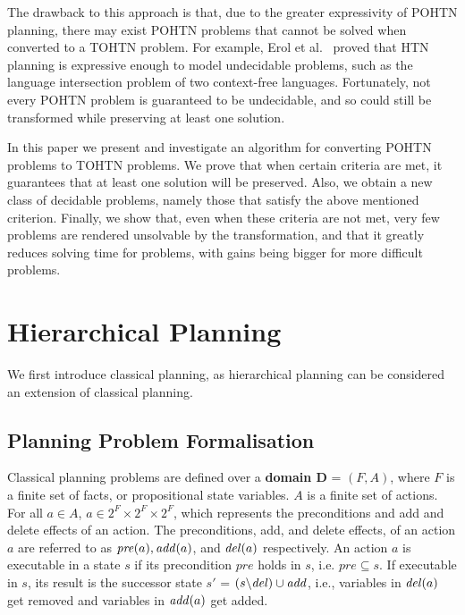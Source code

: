 \documentclass[runningheads]{llncs}
\begin{document}
The drawback to this approach is that, due to the greater expressivity of POHTN planning, there may exist POHTN problems that cannot be solved when converted to a TOHTN problem. For example, Erol et al.\ \cite{ErolHTNExpressivity} proved that HTN planning is expressive enough to model undecidable problems, such as the language intersection problem of two context-free languages. Fortunately, not every POHTN problem is guaranteed to be undecidable, and so could still be transformed while preserving at least one solution.



In this paper we present and investigate an algorithm for converting POHTN problems to TOHTN problems. We prove that when certain criteria are met, it guarantees that at least one solution will be preserved. 
Also, we obtain a new class of decidable problems, namely those that satisfy the above mentioned criterion. Finally, we show that, even when these criteria are not met, very few problems are rendered unsolvable by the transformation, and that it greatly reduces solving time for problems, with gains being bigger for more difficult problems. 



\section{Hierarchical Planning}
We first introduce classical planning, as hierarchical
planning can be considered an extension of classical planning.

\subsection{Planning Problem Formalisation}
Classical planning problems are defined over a \textbf{domain D} = $(F, A)$, where 
$F$ is a finite set of facts, or propositional state variables.
$A$ is a finite set of actions. 
For all $a \in A$,  $a \in 2^F \times 2^F \times 2^F$, which represents the preconditions and add and delete effects of an action. %
The preconditions, add, and delete effects, of an action $a$ are referred to as $\mathit{pre}(a), \mathit{add}(a)$, and $\mathit{del}(a)$ respectively.
An action $a$ is executable in a state $s$ if its precondition $pre$ holds in $s$, i.e. $pre \subseteq s$. 
If executable in $s$, its result is the successor state $s'$ = $(s \backslash \mathit{del}) \cup \mathit{add}$, i.e., variables in $\mathit{del}(a)$ get removed and variables in $\mathit{add}(a)$ get added.
\end{document}
